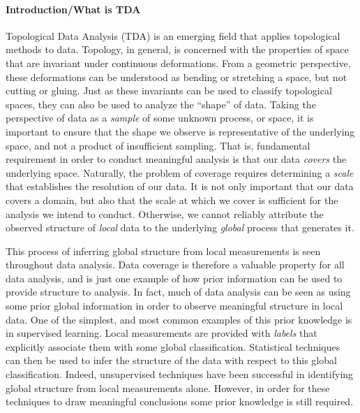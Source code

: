
\paragraph{Introduction/What is TDA}

Topological Data Analysis (TDA) is an emerging field that applies topological methods to data.
Topology, in general, is concerned with the properties of space that are invariant under continuous deformations.
From a geometric perspective, these deformations can be understood as bending or stretching a space, but not cutting or gluing.
Just as these invariants can be used to classify topological spaces, they can also be used to analyze the ``shape'' of data.
Taking the perspective of data as a \emph{sample} of some unknown process, or space, it is important to ensure that the shape we observe is representative of the underlying space, and not a product of insufficient sampling. %
That is, fundamental requirement in order to conduct meaningful analysis is that our data \emph{covers} the underlying space.
Naturally, the problem of coverage requires determining a \emph{scale} that establishes the resolution of our data.
It is not only important that our data covers a domain, but also that the scale at which we cover is sufficient for the analysis we intend to conduct.
Otherwise, we cannot reliably attribute the observed structure of \emph{local} data to the underlying \emph{global} process that generates it.

This process of inferring global structure from local measurements is seen throughout data analysis.
Data coverage is therefore a valuable property for all data analysis, and is just one example of how prior information can be used to provide structure to analysis.
In fact, much of data analysis can be seen as using some prior global information in order to observe meaningful structure in local data.
One of the simplest, and most common examples of this prior knowledge is in supervised learning.
Local measurements are provided with \emph{labels} that explicitly associate them with some global classification.
Statistical techniques can then be used to infer the structure of the data with respect to this global classification.
Indeed, unsupervised techniques have been successful in identifying global structure from local measurements alone.
However, in order for these techniques to draw meaningful conclusions some prior knowledge is still required.

